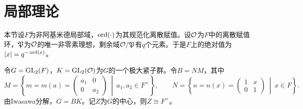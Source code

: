 \section{局部理论}\label{L5S3}
本节设$F$为非阿基米德局部域，$\operatorname{ord}(\cdot)$为其规范化离散赋值。设$\mathcal O$为$F$中的离散赋值环，$\mathfrak{P}$为$\mathcal O$的唯一非零素理想，剩余域$\mathcal O/\mathfrak{P}$有$q$个元素。于是$F$上的绝对值为$|x|=q^{-\operatorname{ord}(x)}$。

令$G=\operatorname{GL}_2(F)$，$K=\operatorname{GL}_2(\mathcal O)$为$G$的一个极大紧子群。令$B=NM$，其中
\[M=\left\{m=m(a)=\begin{pmatrix}a_1&0\\0&a_2\end{pmatrix}\ \middle|\ a_1,a_2\in F^\times\right\},\qquad N=\left\{n=n(x)=\begin{pmatrix}1&x\\0&1\end{pmatrix}\ \middle|\ x\in F\right\}.\]
由Iwasawa分解，$G=BK$。记$Z$为$G$的中心，则$Z\cong F^\times$。

